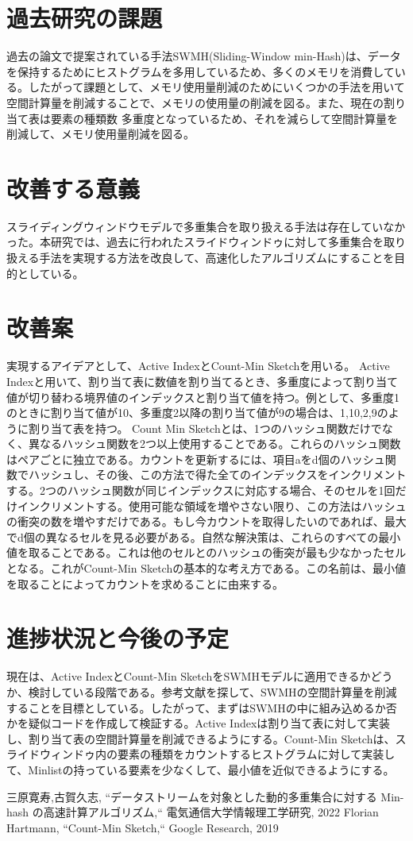 \documentclass{interim} %
\begin{document}
\section{過去研究の課題}
過去の論文で提案されている手法SWMH(Sliding-Window min-Hash)は、データを保持するためにヒストグラムを多用しているため、多くのメモリを消費している。したがって課題として、メモリ使用量削減のためにいくつかの手法を用いて空間計算量を削減することで、メモリの使用量の削減を図る。また、現在の割り当て表は要素の種類数 \times	 多重度となっているため、それを減らして空間計算量を削減して、メモリ使用量削減を図る。

\section{改善する意義}
スライディングウィンドウモデルで多重集合を取り扱える手法は存在していなかった。本研究では、過去に行われたスライドウィンドゥに対して多重集合を取り扱える手法を実現する方法を改良して、高速化したアルゴリズムにすることを目的としている。

\section{改善案}
実現するアイデアとして、Active IndexとCount-Min Sketchを用いる。
Active Indexと用いて、割り当て表に数値を割り当てるとき、多重度によって割り当て値が切り替わる境界値のインデックスと割り当て値を持つ。例として、多重度1のときに割り当て値が10、多重度2以降の割り当て値が9の場合は、1,10,2,9のように割り当て表を持つ。
Count Min Sketchとは、1つのハッシュ関数だけでなく、異なるハッシュ関数を2つ以上使用することである。これらのハッシュ関数はペアごとに独立である。カウントを更新するには、項目aをd個のハッシュ関数でハッシュし、その後、この方法で得た全てのインデックスをインクリメントする。2つのハッシュ関数が同じインデックスに対応する場合、そのセルを1回だけインクリメントする。使用可能な領域を増やさない限り、この方法はハッシュの衝突の数を増やすだけである。もし今カウントを取得したいのであれば、最大でd個の異なるセルを見る必要がある。自然な解決策は、これらのすべての最小値を取ることである。これは他のセルとのハッシュの衝突が最も少なかったセルとなる。これがCount-Min Sketchの基本的な考え方である。この名前は、最小値を取ることによってカウントを求めることに由来する。

\section{進捗状況と今後の予定}

現在は、Active IndexとCount-Min SketchをSWMHモデルに適用できるかどうか、検討している段階である。参考文献を探して、SWMHの空間計算量を削減することを目標としている。したがって、まずはSWMHの中に組み込めるか否かを疑似コードを作成して検証する。Active Indexは割り当て表に対して実装し、割り当て表の空間計算量を削減できるようにする。Count-Min Sketchは、スライドウィンドゥ内の要素の種類をカウントするヒストグラムに対して実装して、Minlistの持っている要素を少なくして、最小値を近似できるようにする。

\begin{thebibliography}{99}
	\scriptsize  %
%	
三原寛寿,古賀久志, ``データストリームを対象とした動的多重集合に対する
Min-hash の高速計算アルゴリズム,`` 電気通信大学情報理工学研究, 2022
Florian Hartmann, ``Count-Min Sketch,``  Google Research, 2019

\end{thebibliography}
\end{document}
